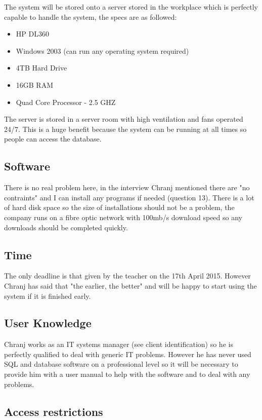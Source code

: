 The system will be stored onto a server stored in the workplace which is perfectly capable to handle the system, the specs are as followed:

\begin{itemize}
\item HP DL360
\item Windows 2003 (can run any operating system required)
\item 4TB Hard Drive
\item 16GB RAM
\item Quad Core Processor - 2.5 GHZ
\end{itemize}

The server is stored in a server room with high ventilation and fans operated 24/7. This is a huge benefit because the system can be running at all times so people can access the database.

\subsection{Software}

There is no real problem here, in the interview Chranj mentioned there are "no contraints" and I can install any programs if needed (question 13). There is a lot of hard disk space so the size of installations should not be a problem, the company runs on a fibre optic network with 100mb/s download speed so any downloads should be completed quickly.

\subsection{Time}

The only deadline is that given by the teacher on the 17th April 2015. However Chranj has said that "the earlier, the better" and will be happy to start using the system if it is finished early.

\subsection{User Knowledge}

Chranj works as an IT systems manager (see client identification) so he is perfectly qualified to deal with generic IT problems. However he has never used SQL and database software on a professional level so it will be necessary to provide him with a user manual to help with the software and to deal with any problems.

\subsection{Access restrictions}

